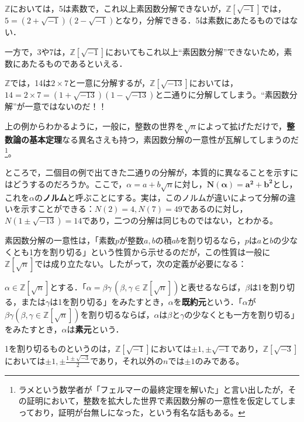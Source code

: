 \begin{mybox}[{$\mathds{Z}[\sqrt{-1}]$}]
    $\mathds{Z}$においては，5は素数で，これ以上素因数分解できないが，$\mathds{Z}[\sqrt{-1}]$では，$5=\left(2+\sqrt{-1}\right)\left(2-\sqrt{-1}\right)$となり，分解できる．5は素数にあたるものではない．

    一方で，3や7は，$\mathds{Z}[\sqrt{-1}]$においてもこれ以上``素因数分解''できないため，素数にあたるものであるといえる．
\end{mybox}

\begin{mybox}[{$\mathds{Z}[\sqrt{-13}]$}]
    $\mathds{Z}$では，14は$2\times 7$と一意に分解するが，$\mathds{Z}[\sqrt{-13}]$においては，$14=2\times 7=(1+\sqrt{-13})(1-\sqrt{-13})$と二通りに分解してしまう。``素因数分解''が一意ではないのだ！！
\end{mybox}

上の例からわかるように，一般に，整数の世界を$\sqrt{n}$によって拡げただけで，\textbf{整数論の基本定理}なる異名さえも持つ，素因数分解の一意性が瓦解してしまうのだ\footnote{ラメという数学者が「フェルマーの最終定理を解いた」と言い出したが，その証明において，整数を拡大した世界で素因数分解の一意性を仮定してしまっており，証明が台無しになった，という有名な話もある。}。

ところで，二個目の例で出てきた二通りの分解が，本質的に異なることを示すにはどうするのだろうか。ここで，$\alpha=a+b\sqrt{n}$に対し，$\boldsymbol{N(\alpha)=a^2+b^2}$とし，これを$\alpha$の\textbf{ノルム}と呼ぶことにする。実は，このノルムが違いによって分解の違いを示すことができる：$N(2)=4, N(7)=49$であるのに対し，$N(1\pm\sqrt{-13})=14$であり，二つの分解は同じものではない，とわかる。

素因数分解の一意性は，「素数$p$が整数$a, b$の積$ab$を割り切るなら，$p$は$a$と$b$の少なくとも1方を割り切る」という性質から示せるのだが，この性質は一般に$\mathds{Z}[\sqrt{n}]$では成り立たない。したがって，次の定義が必要になる：

\begin{dfn}
    $\alpha\in\mathds{Z}[\sqrt{n}]$とする．「$\alpha=\beta\gamma\,\left(\beta, \gamma\in\mathds{Z}[\sqrt{n}]\right)$と表せるならば，$\beta$は1を割り切る，または$\gamma$は1を割り切る」をみたすとき，$\alpha$を\textbf{既約元}という．「$\alpha$が$\beta\gamma\left(\beta, \gamma\in\mathds{Z}[\sqrt{n}]\right)$を割り切るならば，$\alpha$は$\beta$と$\gamma$の少なくとも一方を割り切る」をみたすとき，$\alpha$は\textbf{素元}という．
\end{dfn}

1を割り切るものというのは，$\mathds{Z}[\sqrt{-1}]$においては$\pm 1, \pm\sqrt{-1}$であり，$\mathds{Z}[\sqrt{-3}]$においては$\pm 1, \pm\frac{1\pm\sqrt{-3}}{2}$であり，それ以外の$n$では$\pm 1$のみである。

